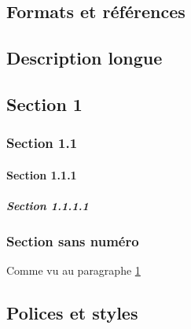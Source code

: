 \documentclass{article}
\begin{document}
\begin{multicols*}{3}
\begin{latexcode}
\end{latexcode}

\section*{Formats et références}
\begin{latexcode}
\tableofcontents   %
\listoffigures     %
\listoftables      %
\listoflistings    %
\index             %
\printindex        %
\printglossary     %
\printbibliography %

\chapter[Description courte]{Description longue}
\label{subsec:foobar}
\section{Section 1}
  \subsection{Section 1.1}
    \subsubsection{Section 1.1.1}
      \paragraph{Section 1.1.1.1}
  \subsection*{Section sans numéro}
Comme vu au paragraphe \ref{subsec:foobar}
\end{latexcode}

\section*{Polices et styles}

\end{multicols*}
\end{document}
